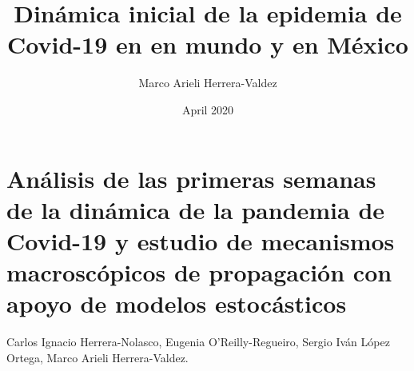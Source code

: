 \documentclass[8pt]{article}
\title{Dinámica inicial de la epidemia de Covid-19 en en mundo y en México }
\author{Marco Arieli Herrera-Valdez}
\date{April 2020}
\begin{document}
%
%
\section*{Análisis de las primeras semanas de la dinámica de la pandemia de {Covid-19} y estudio de mecanismos macroscópicos de propagación con apoyo de modelos estocásticos}
Carlos Ignacio Herrera-Nolasco, Eugenia O'Reilly-Regueiro, Sergio Iván López Ortega, Marco Arieli Herrera-Valdez.










\end{document}
